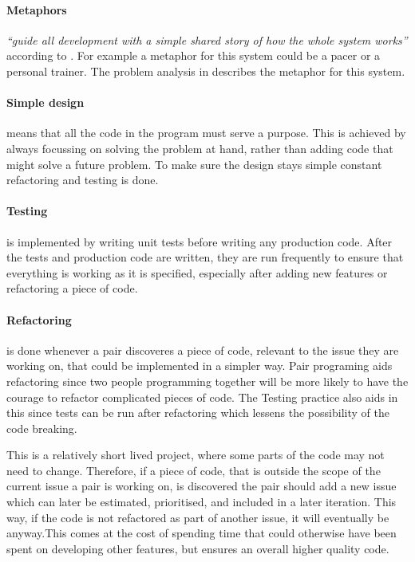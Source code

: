 \paragraph{Metaphors} \textit{``guide all development with a simple shared story of how the whole system works''} according to \cite[p.54]{xp:planning}. For example a metaphor for this system could be a pacer or a personal trainer. The problem analysis in  describes the metaphor for this system.

\paragraph{Simple design} means that all the code in the program must serve a purpose. This is achieved by always focussing on solving the problem at hand, rather than adding code that might solve a future problem. To make sure the design stays simple constant refactoring and testing is done.

\paragraph{Testing} is implemented by writing unit tests before writing any production code. After the tests and production code are written, they are run frequently to ensure that everything is working as it is specified, especially after adding new features or refactoring a piece of code.

\paragraph{Refactoring} is done whenever a pair discoveres a piece of code, relevant to the issue they are working on, that could be implemented in a simpler way. Pair programing aids refactoring since two people programming together will be more likely to have the courage to refactor complicated pieces of code. The Testing practice also aids in this since tests can be run after refactoring which lessens the possibility of the code breaking.

This is a relatively short lived project, where some parts of the code may not need to change. Therefore, if a piece of code, that is outside the scope of the current issue a pair is working on, is discovered the pair should add a new issue which can later be estimated, prioritised, and included in a later iteration. This way, if the code is not refactored as part of another issue, it will eventually be anyway.This comes at the cost of spending time that could otherwise have been spent on developing other features, but ensures an overall higher quality code. 

